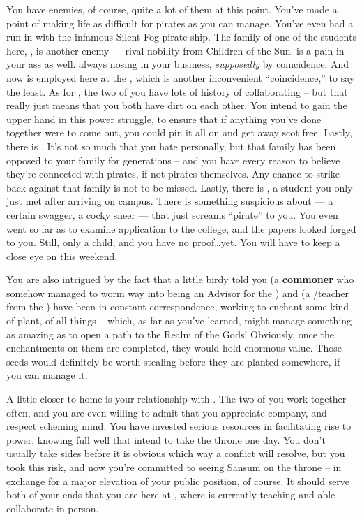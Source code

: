 \documentclass[char]{GL2020}
\begin{document}
You have enemies, of course, quite a lot of them at this point. You've made a point of making life as difficult for pirates as you can manage. You've even had a run in with the infamous Silent Fog pirate ship. The family of one of the students here, \cChupStudent{\full}, is another enemy — rival nobility from Children of the Sun. \cInterpol{\full} is a pain in your ass as well. \cInterpol{\Theyare} always nosing in your business, \emph{supposedly} by coincidence. And now \cInterpol{} is employed here at the \pSc{}, which is another inconvenient ``coincidence,'' to say the least. As for \cDiplomat{}, the two of you have lots of history of collaborating -- but that really just means that you both have dirt on each other. You intend to gain the upper hand in this power struggle, to ensure that if anything you've done together were to come out, you could pin it all on \cDiplomat{} and get away scot free. Lastly, there is \cJuniorStatesman{\full}. It's not so much that you hate \cJuniorStatesman{} personally, but that \cJuniorStatesman{\their} family has been opposed to your family for generations -- and you have every reason to believe they're connected with pirates, if not pirates themselves. Any chance to strike back against that family is not to be missed. Lastly, there is \cPirateChild{\full}, a student you only just met after arriving on campus. There is something suspicious about \cPirateChild{\them} — a certain swagger, a cocky sneer — that just screams ``pirate'' to you. You even went so far as to examine  \cPirateChild{\their} application to the college, and the papers looked forged to you. Still, \cPirateChild{\theyare} only a child, and you have no proof\ldots yet. You will have to keep a close eye on \cPirateChild{\them} this weekend.

You are also intrigued by the fact that a little birdy told you \cCurse{\full} (a \textbf{commoner} who somehow managed to worm \cCurse{\their} way into being an Advisor for the \pFarm{}) and \cFlowPriest{\full} (a \cFlowPriest{\cleric}/teacher from the \pShip{}) have been in constant correspondence, working to enchant some kind of plant, of all things -- which, as far as you've learned, might manage something as amazing as to open a path to the Realm of the Gods! Obviously, once the enchantments on them are completed, they would hold enormous value. Those seeds would definitely be worth stealing before they are planted somewhere, if you can manage it.

A little closer to home is your relationship with \cPrince{\full}. The two of you work together often, and you are even willing to admit that you appreciate \cPrince{\their} company, and respect \cPrince{\their} scheming mind. You have invested serious resources in facilitating \cPrince{\their} rise to power, knowing full well that \cPrince{\they} intend\cPrince{\plural} to take the throne one day. You don't usually take sides before it is obvious which way a conflict will resolve, but you took this risk, and now you're committed to seeing Sansum on the throne -- in exchange for a major elevation of your public position, of course. It should serve both of your ends that you are here at \pSchool{}, where \cPrince{} is currently teaching and able collaborate in person. 
\end{document}
